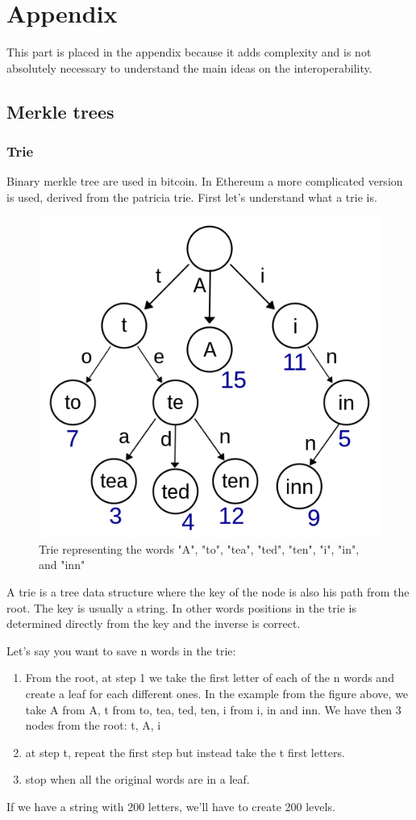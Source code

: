 \chapter{Appendix}
This part is placed in the appendix because it adds complexity and is not absolutely necessary to understand the main ideas on the interoperability. 

\section{Merkle trees}
\subsection{Trie}
Binary merkle tree are used in bitcoin. 
In Ethereum a more complicated version is used, derived from the patricia trie. First let's understand what a trie is. 
\begin{figure}[H]
    \centering
\includegraphics[width=0.3\linewidth]{background/trie.png}
    \caption{Trie representing the words "A", "to", "tea", "ted", "ten", "i", "in", and "inn"}
    \label{fig:trie}
\end{figure}
A trie is a tree data structure where the key of the node is also his path from the root. The key is usually a string.
In other words positions in the trie is determined directly from the key and the inverse is correct. 

Let's say you want to save n words in the trie:
\begin{enumerate}
    \item From the root, at step 1 we take the first letter of each of the n words and create a leaf for each different ones. In the example from the figure above, we  take A from A, t from to, tea, ted, ten, i from i, in and inn. We have then 3 nodes from the root: t, A, i
    \item at step t, repeat the first step but instead take the t first letters. 
    \item stop when all the original words are in a leaf. 
\end{enumerate}
If we have a string with 200 letters, we'll have to create 200 levels.
